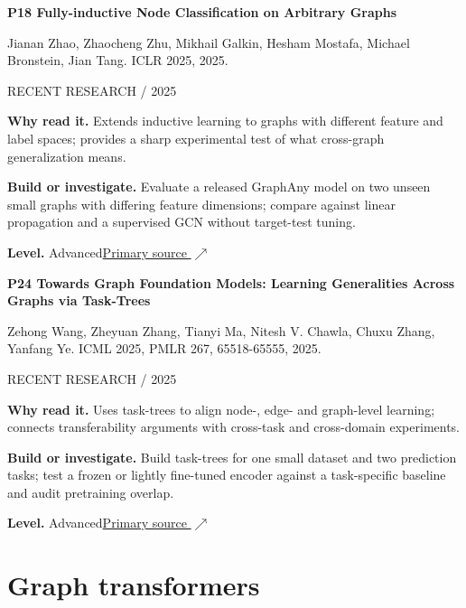 \documentclass[11pt,letterpaper]{article}
\begin{document}
\begin{minipage}{\linewidth}
{\large\bfseries P18 Fully-inductive Node Classification on Arbitrary Graphs}\par
Jianan Zhao, Zhaocheng Zhu, Mikhail Galkin, Hesham Mostafa, Michael Bronstein, Jian Tang. ICLR 2025, 2025.\par
\textcolor{ink}{\small RECENT RESEARCH / 2025}\par
\textbf{Why read it.} Extends inductive learning to graphs with different feature and label spaces; provides a sharp experimental test of what cross-graph generalization means.\par
\textbf{Build or investigate.} Evaluate a released GraphAny model on two unseen small graphs with differing feature dimensions; compare against linear propagation and a supervised GCN without target-test tuning.\par
\textbf{Level.} Advanced\quad\href{https://proceedings.iclr.cc/paper_files/paper/2025/hash/3bdeb28a531f7af94b56bcdf8ee88f17-Abstract-Conference.html}{Primary source $\nearrow$}\par
\end{minipage}\par\vspace{10pt}
\begin{minipage}{\linewidth}
{\large\bfseries P24 Towards Graph Foundation Models: Learning Generalities Across Graphs via Task-Trees}\par
Zehong Wang, Zheyuan Zhang, Tianyi Ma, Nitesh V. Chawla, Chuxu Zhang, Yanfang Ye. ICML 2025, PMLR 267, 65518-65555, 2025.\par
\textcolor{ink}{\small RECENT RESEARCH / 2025}\par
\textbf{Why read it.} Uses task-trees to align node-, edge- and graph-level learning; connects transferability arguments with cross-task and cross-domain experiments.\par
\textbf{Build or investigate.} Build task-trees for one small dataset and two prediction tasks; test a frozen or lightly fine-tuned encoder against a task-specific baseline and audit pretraining overlap.\par
\textbf{Level.} Advanced\quad\href{https://proceedings.mlr.press/v267/wang25eq.html}{Primary source $\nearrow$}\par
\end{minipage}\par\vspace{10pt}
\section*{Graph transformers}
\end{document}
